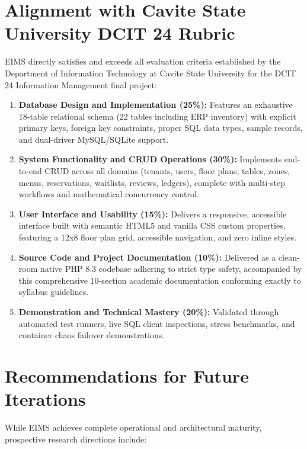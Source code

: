 \section{Alignment with Cavite State University DCIT 24 Rubric}
\label{sec:concl_rubric_alignment}
EIMS directly satisfies and exceeds all evaluation criteria established by the Department of Information Technology at Cavite State University for the DCIT 24 Information Management final project:

\begin{enumerate}
    \item \textbf{Database Design and Implementation (25\%):} Features an exhaustive 18-table relational schema (22 tables including ERP inventory) with explicit primary keys, foreign key constraints, proper SQL data types, sample records, and dual-driver MySQL/SQLite support.
    \item \textbf{System Functionality and CRUD Operations (30\%):} Implements end-to-end CRUD across all domains (tenants, users, floor plans, tables, zones, menus, reservations, waitlists, reviews, ledgers), complete with multi-step workflows and mathematical concurrency control.
    \item \textbf{User Interface and Usability (15\%):} Delivers a responsive, accessible interface built with semantic HTML5 and vanilla CSS custom properties, featuring a 12x8 floor plan grid, accessible navigation, and zero inline styles.
    \item \textbf{Source Code and Project Documentation (10\%):} Delivered as a clean-room native PHP 8.3 codebase adhering to strict type safety, accompanied by this comprehensive 10-section academic documentation conforming exactly to syllabus guidelines.
    \item \textbf{Demonstration and Technical Mastery (20\%):} Validated through automated test runners, live SQL client inspections, stress benchmarks, and container chaos failover demonstrations.
\end{enumerate}

\section{Recommendations for Future Iterations}
\label{sec:concl_future_work}
While EIMS achieves complete operational and architectural maturity, prospective research directions include:

